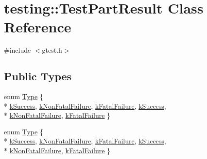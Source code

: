 \hypertarget{classtesting_1_1_test_part_result}{\section{testing\-:\-:Test\-Part\-Result Class Reference}
\label{classtesting_1_1_test_part_result}
}


{\ttfamily \#include $<$gtest.\-h$>$}

\subsection*{Public Types}
\begin{DoxyCompactItemize}
\item 
enum \hyperlink{classtesting_1_1_test_part_result_a65ae656b33fdfdfffaf34858778a52d5}{Type} \{ \\*
\hyperlink{classtesting_1_1_test_part_result_a65ae656b33fdfdfffaf34858778a52d5a2f9a7e9f6c2df7b0d2212add7ce0a8be}{k\-Success}, 
\hyperlink{classtesting_1_1_test_part_result_a65ae656b33fdfdfffaf34858778a52d5ade889093a860e9b21e703be6226d7cec}{k\-Non\-Fatal\-Failure}, 
\hyperlink{classtesting_1_1_test_part_result_a65ae656b33fdfdfffaf34858778a52d5a7d1d53c4de784e24c5c2efbe14af6786}{k\-Fatal\-Failure}, 
\hyperlink{classtesting_1_1_test_part_result_a65ae656b33fdfdfffaf34858778a52d5a2f9a7e9f6c2df7b0d2212add7ce0a8be}{k\-Success}, 
\\*
\hyperlink{classtesting_1_1_test_part_result_a65ae656b33fdfdfffaf34858778a52d5ade889093a860e9b21e703be6226d7cec}{k\-Non\-Fatal\-Failure}, 
\hyperlink{classtesting_1_1_test_part_result_a65ae656b33fdfdfffaf34858778a52d5a7d1d53c4de784e24c5c2efbe14af6786}{k\-Fatal\-Failure}
 \}
\item 
enum \hyperlink{classtesting_1_1_test_part_result_a65ae656b33fdfdfffaf34858778a52d5}{Type} \{ \\*
\hyperlink{classtesting_1_1_test_part_result_a65ae656b33fdfdfffaf34858778a52d5a2f9a7e9f6c2df7b0d2212add7ce0a8be}{k\-Success}, 
\hyperlink{classtesting_1_1_test_part_result_a65ae656b33fdfdfffaf34858778a52d5ade889093a860e9b21e703be6226d7cec}{k\-Non\-Fatal\-Failure}, 
\hyperlink{classtesting_1_1_test_part_result_a65ae656b33fdfdfffaf34858778a52d5a7d1d53c4de784e24c5c2efbe14af6786}{k\-Fatal\-Failure}, 
\hyperlink{classtesting_1_1_test_part_result_a65ae656b33fdfdfffaf34858778a52d5a2f9a7e9f6c2df7b0d2212add7ce0a8be}{k\-Success}, 
\\*
\hyperlink{classtesting_1_1_test_part_result_a65ae656b33fdfdfffaf34858778a52d5ade889093a860e9b21e703be6226d7cec}{k\-Non\-Fatal\-Failure}, 
\hyperlink{classtesting_1_1_test_part_result_a65ae656b33fdfdfffaf34858778a52d5a7d1d53c4de784e24c5c2efbe14af6786}{k\-Fatal\-Failure}
 \}
\end{DoxyCompactItemize}
